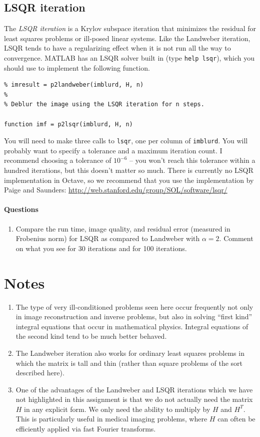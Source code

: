 \documentclass[12pt, leqno]{article} %
\begin{document}
\subsection{LSQR iteration}

The {\em LSQR iteration} is a Krylov subspace iteration that minimizes
the residual for least squares problems or ill-posed linear systems.
Like the Landweber iteration, LSQR tends to have a regularizing effect
when it is not run all the way to convergence.  MATLAB has an LSQR
solver built in (type {\tt help lsqr}), which you should use to
implement the following function.
\begin{lstlisting}
% imresult = p2landweber(imblurd, H, n)
%
% Deblur the image using the LSQR iteration for n steps.

function imf = p2lsqr(imblurd, H, n)
\end{lstlisting}
You will need to make three calls to {\tt lsqr}, one per column of
{\tt imblurd}.  You will probably want to specify a tolerance and
a maximum iteration count.  I recommend choosing a tolerance of
$10^{-6}$ -- you won't reach this tolerance within a hundred
iterations, but this doesn't matter so much. There is currently no
LSQR implementation in Octave, so we recommend that you use
the implementation by Paige and Saunders:
\url{http://web.stanford.edu/group/SOL/software/lsqr/}

\paragraph*{Questions}

\begin{enumerate}
\item
  Compare the run time, image quality, and residual error (measured in
  Frobenius norm) for LSQR as compared to Landweber with $\alpha = 2$.
  Comment on what you see for 30 iterations and for 100 iterations.
\end{enumerate}

\section{Notes}

\begin{enumerate}
\item
  The type of very ill-conditioned problems seen here occur frequently
  not only in image reconstruction and inverse problems, but also in
  solving ``first kind'' integral equations that occur in mathematical
  physics.  Integral equations of the second kind tend to be much
  better behaved.
\item
  The Landweber iteration also works for ordinary least squares
  problems in which the matrix is tall and thin (rather than
  square problems of the sort described here).
\item
  One of the advantages of the Landweber and LSQR iterations which we have
  not highlighted in this assignment is that we do not actually need
  the matrix $H$ in any explicit form.  We only need the ability to
  multiply by $H$ and $H^T$.  This is particularly useful in medical
  imaging problems, where $H$ can often be efficiently applied via
  fast Fourier transforms.
\end{enumerate}
\end{document}
